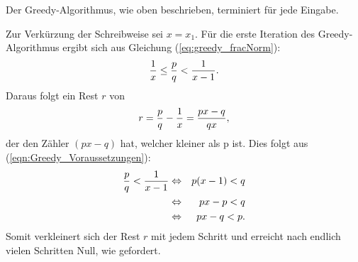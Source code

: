 \begin{satz}
	Der Greedy-Algorithmus, wie oben beschrieben, terminiert für jede Eingabe.
\end{satz}
\begin{bew}
	Zur Verkürzung der Schreibweise sei  $x = x_1$.
	Für die erste Iteration des Greedy-Algorithmus ergibt sich aus Gleichung (\ref{eq:greedy_fracNorm}):
	\begin{equation}\label{eqn:Greedy_Voraussetzungen}
		\frac{1}{x} \leq \frac{p}{q} < \frac{1}{x-1}.
	\end{equation}
	Daraus folgt ein Rest $r$ von
	$$ r = \frac{p}{q}-\frac{1}{x} = \frac{px-q}{qx},$$
	der den Zähler $(px-q)$ hat, welcher kleiner als p ist. Dies folgt aus (\ref{eqn:Greedy_Voraussetzungen}):
	\begin{eqnarray*}
		\frac{p}{q} < \frac{1}{x-1}& \Leftrightarrow & p(x-1)<q\\
		& \Leftrightarrow & px-p < q\\
		& \Leftrightarrow & px-q < p.\\
	\end{eqnarray*}
	Somit verkleinert sich der Rest $r$ mit jedem Schritt und erreicht nach endlich vielen Schritten Null, wie gefordert.
\end{bew}